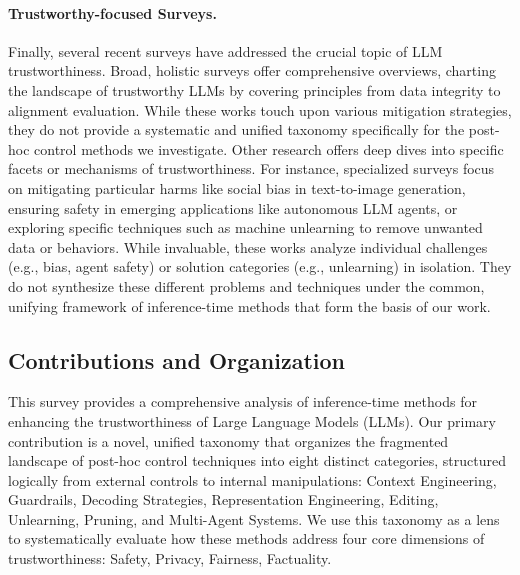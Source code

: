 \paragraph{Trustworthy-focused Surveys.}
Finally, several recent surveys have addressed the crucial topic of LLM trustworthiness.
Broad, holistic surveys offer comprehensive overviews, charting the landscape of trustworthy LLMs by covering principles from data integrity to alignment evaluation\citep{survey:trustworthy1, survey:trustworthy2}.
While these works touch upon various mitigation strategies, they do not provide a systematic and unified taxonomy specifically for the post-hoc control methods we investigate.
Other research offers deep dives into specific facets or mechanisms of trustworthiness.
For instance, specialized surveys focus on mitigating particular harms like social bias in text-to-image generation\citep{survey:trustworthy_text2img}, ensuring safety in emerging applications like autonomous LLM agents\citep{survey:trustworthy_agents}, or exploring specific techniques such as machine unlearning to remove unwanted data or behaviors\citep{survey:unlearning1, survey:unlearning2}.
While invaluable, these works analyze individual challenges (e.g., bias, agent safety) or solution categories (e.g., unlearning) in isolation. They do not synthesize these different problems and techniques under the common, unifying framework of inference-time methods that form the basis of our work.


\subsection{Contributions and Organization}
This survey provides a comprehensive analysis of inference-time methods for enhancing the trustworthiness of Large Language Models (LLMs). Our primary contribution is a novel, unified taxonomy that organizes the fragmented landscape of post-hoc control techniques into eight distinct categories, structured logically from external controls to internal manipulations: Context Engineering, Guardrails, Decoding Strategies, Representation Engineering, Editing, Unlearning, Pruning, and Multi-Agent Systems. We use this taxonomy as a lens to systematically evaluate how these methods address four core dimensions of trustworthiness: Safety, Privacy, Fairness, Factuality.

